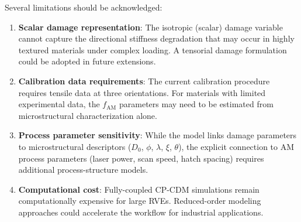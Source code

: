 \documentclass[twocolumn]{sagej}
\begin{document}
Several limitations should be acknowledged:

\begin{enumerate}\def\labelenumi{(\arabic{enumi})}
    \item \textbf{Scalar damage representation}: The isotropic (scalar) damage variable cannot capture the directional stiffness degradation that may occur in highly textured materials under complex loading. A tensorial damage formulation \cite{chaboche1988continuum,murakami1988mechanical} could be adopted in future extensions.
    
    \item \textbf{Calibration data requirements}: The current calibration procedure requires tensile data at three orientations. For materials with limited experimental data, the $f_{\text{AM}}$ parameters may need to be estimated from microstructural characterization alone.
    
    \item \textbf{Process parameter sensitivity}: While the model links damage parameters to microstructural descriptors ($D_0$, $\phi$, $\lambda$, $\xi$, $\theta$), the explicit connection to AM process parameters (laser power, scan speed, hatch spacing) requires additional process-structure models.
    
    \item \textbf{Computational cost}: Fully-coupled CP-CDM simulations remain computationally expensive for large RVEs. Reduced-order modeling approaches \cite{zhang2021modeling} could accelerate the workflow for industrial applications.
    

\end{enumerate}
\end{document}
